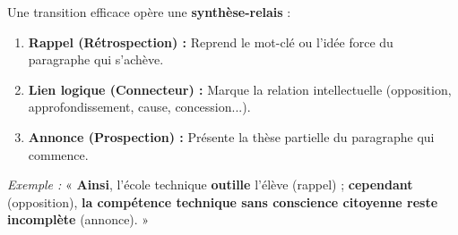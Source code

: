 \documentclass[11pt]{article}
\begin{document}
\begin{propriete}[Anatomie d'une transition réussie = 3 composantes]
Une transition efficace opère une \textbf{synthèse-relais} :
\begin{enumerate}
    \item \textbf{Rappel (Rétrospection) :} Reprend le mot-clé ou l'idée force du paragraphe qui s'achève.
    \item \textbf{Lien logique (Connecteur) :} Marque la relation intellectuelle (opposition, approfondissement, cause, concession...).
    \item \textbf{Annonce (Prospection) :} Présente la thèse partielle du paragraphe qui commence.
\end{enumerate}
\emph{Exemple :} « \textbf{Ainsi}, l'école technique \textbf{outille} l'élève (rappel) ; \textbf{cependant} (opposition), \textbf{la compétence technique sans conscience citoyenne reste incomplète} (annonce). »
\end{propriete}
\end{document}
